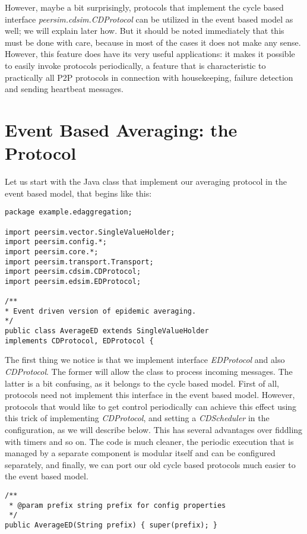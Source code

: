 \documentclass[a4paper,11pt]{article}
\begin{document}
However, maybe a bit surprisingly, protocols that implement the cycle based
interface \emph{peersim.cdsim.CDProtocol} can be utilized in the event
based model as well; we will explain later how.
But it should be noted immediately that this must be done with care, because
in most of the cases it does not make any sense.
However, this feature does have its very useful applications: it makes it
possible to easily invoke protocols periodically, a feature that is
characteristic to practically all P2P protocols in connection with
housekeeping, failure detection and sending heartbeat messages.

\section{Event Based Averaging: the Protocol}

Let us start with the Java class that implement our averaging protocol
in the event based model, that begins like this:
\footnotesize
\begin{verbatim}
package example.edaggregation;

import peersim.vector.SingleValueHolder;
import peersim.config.*;
import peersim.core.*;
import peersim.transport.Transport;
import peersim.cdsim.CDProtocol;
import peersim.edsim.EDProtocol;

/**
* Event driven version of epidemic averaging.
*/
public class AverageED extends SingleValueHolder
implements CDProtocol, EDProtocol {
\end{verbatim}
\normalsize

The first thing we notice is that we implement interface \emph{EDProtocol}
and also \emph{CDProtocol}.
The former will allow the class to process incoming messages.
The latter is a bit confusing, as it belongs to the cycle based model.
First of all, protocols need not implement this interface in the event
based model.
However, protocols that would like to get control periodically can achieve
this effect using this trick of implementing \emph{CDProtocol}, and
setting a \emph{CDScheduler} in the configuration, as we will describe
below.
This has several advantages over fiddling with timers and so on.
The code is much cleaner, the periodic execution that is managed by a separate
component is modular itself and can be configured separately, and finally,
we can port our old cycle based protocols much easier to the event based
model.

\footnotesize
\begin{verbatim}
/**
 * @param prefix string prefix for config properties
 */
public AverageED(String prefix) { super(prefix); }
\end{verbatim}
\normalsize
\end{document}
